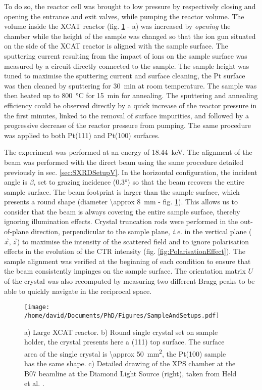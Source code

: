 To do so, the reactor cell was brought to low pressure by respectively closing and opening the entrance and exit valves, while pumping the reactor volume.
The volume inside the XCAT reactor (fig. \ref{fig:SampleSXRD} - a) was increased by \textit{opening} the chamber while the height of the sample was changed so that the ion gun situated on the side of the XCAT reactor is aligned with the sample surface.
The sputtering current resulting from the impact of ions on the sample surface was measured by a circuit directly connected to the sample.
The sample height was tuned to maximise the sputtering current and surface cleaning, the Pt surface was then cleaned by sputtering for \qty{30}{\minute} at room temperature.
The sample was then heated up to \qty{800}{\degreeCelsius} for \qty{15}{\minute} for annealing.
The sputtering and annealing efficiency could be observed directly by a quick increase of the reactor pressure in the first minutes, linked to the removal of surface impurities, and followed by a progressive decrease of the reactor pressure from pumping.
The same procedure was applied to both Pt(111) and Pt(100) surfaces.

The experiment was performed at an energy of \qty{18.44}{\keV}.
The alignment of the beam was performed with the direct beam using the same procedure detailed previously in sec. \ref{sec:SXRDSetupV}.
In the horizontal configuration, the incident angle is $\beta$, set to grazing incidence (\ang{0.3}) so that the beam recovers the entire sample surface.
The beam footprint is larger than the sample surface, which presents a round shape (diameter \qty{\approx 8}{\mm} - fig. \ref{fig:SampleSXRD}).
This allows us to consider that the beam is always covering the entire sample surface, thereby ignoring illumination effects.
Crystal truncation rods were performed in the out-of-plane direction, perpendicular to the sample plane, \textit{i.e.} in the vertical plane ($\vec{x}, \vec{z}$) to maximise the intensity of the scattered field and to ignore polarisation effects in the evolution of the CTR intensity (fig. \ref{fig:PolarisationEffect}).
The sample alignment was verified at the beginning of each condition to ensure that the beam consistently impinges on the sample surface.
The orientation matrix $U$ of the crystal \parencite{Schleputz2011} was also recomputed by measuring two different Bragg peaks to be able to quickly navigate in the reciprocal space.

\begin{figure}[!htb]
    \centering
    \texttt{[image: /home/david/Documents/PhD/Figures/SampleAndSetups.pdf]}
    \caption{
        a) Large XCAT reactor.
        b) Round single crystal set on sample holder, the crystal presents here a (111) top surface.
        The surface area of the single crystal is \qty{\approx 50}{\mm^2}, the Pt(100) sample has the same shape.
        c) Detailed drawing of the XPS chamber at the B07 beamline at the Diamond Light Source (right), taken from Held et al. \parencite*{Held2020}.
    }
    \label{fig:SampleSXRD}
\end{figure}

